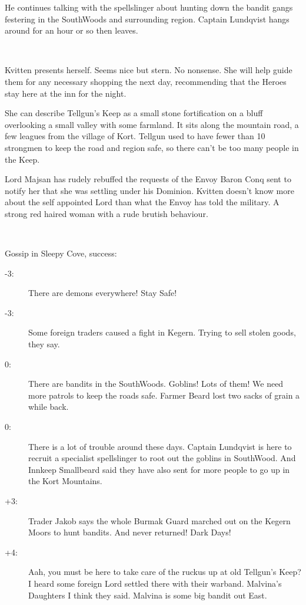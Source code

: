 He continues talking with the spellslinger about hunting down the bandit gangs festering in the SouthWoods and surrounding region. Captain Lundqvist hangs around for an hour or so then leaves.

\

Kvitten presents herself. Seems nice but stern. No nonsense. She will help guide them for any necessary shopping the next day, recommending that the Heroes stay here at the inn for the night.

She can describe Tellgun's Keep as a small stone fortification on a bluff overlooking a small valley with some farmland. It sits along the mountain road, a few leagues from the village of Kort. Tellgun used to have fewer than 10 strongmen to keep the road and region safe, so there can't be too many people in the Keep.

Lord Majsan has rudely rebuffed the requests of the Envoy Baron Conq sent to notify her that she was settling under his Dominion. Kvitten doesn't know more about the self appointed Lord than what the Envoy has told the military. A strong red haired woman with a rude brutish behaviour.

\

\noindent
Gossip in Sleepy Cove, success:
\begin{description}
    \item[-3:] There are demons everywhere! Stay Safe!
    \item[-3:] Some foreign traders caused a fight in Kegern. Trying to sell stolen goods, they say.
    \item[0:] There are bandits in the SouthWoods. Goblins! Lots of them! We need more patrols to keep the roads safe. Farmer Beard lost two sacks of grain a while back.
    \item[0:] There is a lot of trouble around these days. Captain Lundqvist is here to recruit a specialist spellslinger to root out the goblins in SouthWood. And Innkeep Smallbeard said they have also sent for more people to go up in the Kort Mountains.
    \item[+3:] Trader Jakob says the whole Burmak Guard marched out on the Kegern Moors to hunt bandits. And never returned! Dark Days!
    \item[+4:] Aah, you must be here to take care of the ruckus up at old Tellgun's Keep? I heard some foreign Lord settled there with their warband. Malvina's Daughters I think they said. Malvina is some big bandit out East.
\end{description}

